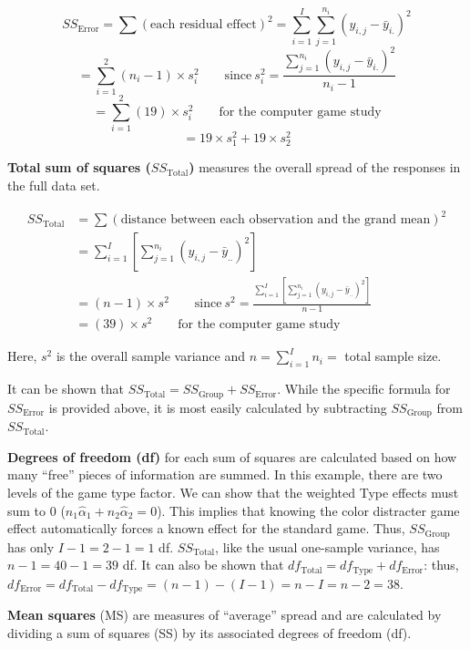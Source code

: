 \documentclass[
]{report}
\begin{document}
\[
SS_{\text{Error}} = \sum (\text{each residual effect})^2 = \sum_{i=1}^{I} \sum_{j=1}^{n_i} (y_{i,j} - \bar{y}_{i.})^2
\]
\[
= \sum_{i=1}^{2} (n_i - 1) \times s_i^2 \qquad \text{since} \ s_i^2 = \frac{\sum_{j=1}^{n_i} (y_{i,j} - \bar{y}_{i.})^2}{n_i - 1}
\]
\[
= \sum_{i=1}^{2} (19) \times s_i^2 \qquad \text{for the computer game study}
\]
\[
= 19 \times s_1^2 + 19 \times s_2^2
\]

\textbf{Total sum of squares (\(SS_{\text{Total}}\))} measures the overall spread of the responses in the full data set.

\begin{align}
SS_{\text{Total}} &= \sum (\text{distance between each observation and the grand mean})^2 \\
&= \sum_{i=1}^{I} \left[ \sum_{j=1}^{n_i} (y_{i,j} - \bar{y}_{..})^2 \right] \\
&= (n - 1) \times s^2 \qquad \text{since} \ s^2 = \frac{ \sum_{i=1}^{I} \left[ \sum_{j=1}^{n_i} (y_{i,j} - \bar{y}_{..})^2 \right] }{n - 1} \\
&= (39) \times s^2 \qquad \text{for the computer game study}
\end{align}

Here, \(s^2\) is the overall sample variance and \(n = \sum_{i=1}^{I} n_i =\) total sample size.

It can be shown that \(SS_{\text{Total}} = SS_{\text{Group}} + SS_{\text{Error}}\). While the specific formula for \(SS_{\text{Error}}\) is provided above, it is most easily calculated by subtracting \(SS_{\text{Group}}\) from \(SS_{\text{Total}}\).

\textbf{Degrees of freedom (df)} for each sum of squares are calculated based on how many ``free'' pieces of information are summed. In this example, there are two levels of the game type factor. We can show that the weighted Type effects must sum to 0 (\(n_1 \hat{\alpha}_1 + n_2 \hat{\alpha}_2 = 0\)). This implies that knowing the color distracter game effect automatically forces a known effect for the standard game. Thus, \(SS_{\text{Group}}\) has only \(I - 1 = 2 - 1 = 1\) df. \(SS_{\text{Total}}\), like the usual one-sample variance, has \(n - 1 = 40 - 1 = 39\) df. It can also be shown that \(df_{\text{Total}} = df_{\text{Type}} + df_{\text{Error}}\): thus, \(df_{\text{Error}} = df_{\text{Total}} - df_{\text{Type}} = (n - 1) - (I - 1) = n - I = n - 2 = 38\).

\textbf{Mean squares} (MS) are measures of ``average'' spread and are calculated by dividing a sum of squares
(SS) by its associated degrees of freedom (df).
\end{document}
